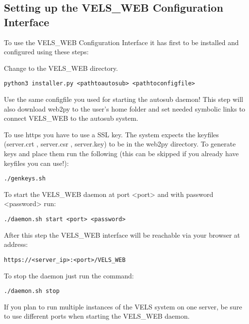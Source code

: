 \subsection{Setting up the VELS\_WEB Configuration Interface}
To use the VELS\_WEB Configuration Interface it has first to be installed and
configured using these steps:

Change to the VELS\_WEB directory.

\begin{verbatim}
python3 installer.py <pathtoautosub> <pathtoconfigfile>
\end{verbatim}
Use the same configfile you used for starting the autosub daemon! This step will
also download web2py to the user's home folder and set needed symbolic links to 
connect VELS\_WEB to the autosub system.

To use https you have to use a SSL key. The system expects the keyfiles
(server.crt , server.csr , server.key) to be in the web2py directory. To
generate keys and place them run the following (this can be skipped if you 
already have keyfiles you can use!):

\begin{verbatim}
./genkeys.sh    
\end{verbatim}

To start the VELS\_WEB daemon at port <port> and with password <password> run:
\begin{verbatim}
./daemon.sh start <port> <password> 
\end{verbatim}

After this step the VELS\_WEB interface will be reachable via your browser at
address:
\begin{verbatim}
https://<server_ip>:<port>/VELS_WEB
\end{verbatim}

To stop the daemon just run the command:

\begin{verbatim}
./daemon.sh stop
\end{verbatim}

If you plan to run multiple instances of the VELS system on one server, be sure to 
use different ports when starting the VELS\_WEB daemon.

